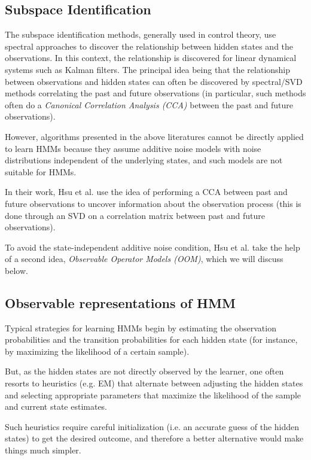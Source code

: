 \subsection{Subspace Identification}

The subspace identification methods, generally used in control theory, use spectral approaches to discover the relationship between hidden states and the observations. In this context, the relationship is
discovered for linear dynamical systems such as Kalman filters. The principal idea being that the relationship between observations and hidden states can often be discovered by spectral/SVD methods correlating the past and future observations (in particular, such methods often do a \textit{Canonical
Correlation Analysis (CCA)}\cite{ref14} between the past and future observations).

However, algorithms presented in the above literatures cannot be directly
applied to learn HMMs because they assume additive noise models with noise distributions independent of the underlying states, and such models are not suitable for HMMs.

In their work, Hsu et al.\cite{ref2} use the idea of performing a CCA between past and future observations to uncover information about the observation process (this is done through
an SVD on a correlation matrix between past and future observations).

To avoid the state-independent additive noise condition, Hsu et al.\cite{ref2} take the help of a second idea, \textit{Observable Operator Models (OOM)}, which we will discuss below.

\subsection{Observable representations of HMM}

Typical strategies for learning HMMs begin by estimating the observation probabilities and the transition probabilities for each hidden state (for instance, by maximizing the likelihood of a certain sample).

But, as the hidden states are not directly observed by the learner, one often resorts to heuristics (e.g. EM) that alternate
between adjusting the hidden states and selecting appropriate parameters that maximize the likelihood of the sample and current state estimates. 

Such heuristics require careful initialization (i.e. an accurate guess of the hidden states) to get the desired outcome, and therefore a better alternative would make things much simpler. 

